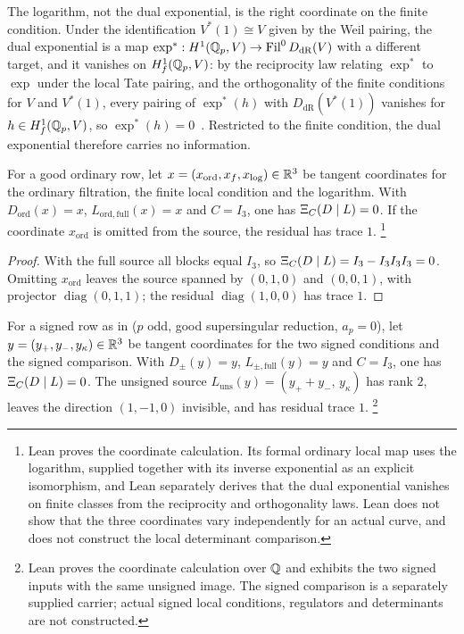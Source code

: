 The logarithm, not the dual exponential, is the right coordinate on the
finite condition.  Under the identification $V^*(1)\cong V$ given by the
Weil pairing, the dual exponential is a map
$\exp^*:H^1(\mathbb{Q}_p,V)\to\operatorname{Fil}^0D_{\mathrm{dR}}(V)$ with a
different target, and it vanishes on $H^1_f(\mathbb{Q}_p,V)$: by the reciprocity law
relating $\exp^*$ to $\exp$ under the local Tate pairing, and the
orthogonality of the finite conditions for $V$ and $V^*(1)$, every
pairing of $\exp^*(h)$ with $D_{\mathrm{dR}}(V^*(1))$ vanishes for
$h\in H^1_f(\mathbb{Q}_p,V)$, so $\exp^*(h)=0$~\citep{BlochKato1990,Kato2004}.
Restricted to the finite condition, the dual exponential therefore
carries no information.

\begin{theorem}\label{thm:apparatus:ordinary-schur-collapse}
For a good ordinary row, let $x=(x_{\mathrm{ord}},x_f,x_{\log})\in\mathbb{R}^3$ be
tangent coordinates for the ordinary filtration, the finite local
condition and the logarithm.  With
$D_{\mathrm{ord}}(x)=x$, $L_{\mathrm{ord,full}}(x)=x$ and $C=I_3$, one has
$\Xi_C(D\mid L)=0$.  If the coordinate $x_{\mathrm{ord}}$ is omitted from the source,
the residual has trace $1$.%
\footnote{Lean proves the coordinate calculation.  Its formal ordinary
local map uses the logarithm, supplied together with its inverse
exponential as an explicit isomorphism, and Lean separately derives that
the dual exponential vanishes on finite classes from the reciprocity and
orthogonality laws.  Lean does not show that the three coordinates vary
independently for an actual curve, and does not construct the local
determinant comparison.}
\end{theorem}

\begin{proof}
With the full source all blocks equal $I_3$, so $\Xi_C(D\mid L)=I_3-I_3I_3I_3=0$.
Omitting $x_{\mathrm{ord}}$ leaves the source spanned by $(0,1,0)$ and
$(0,0,1)$, with projector $\operatorname{diag}(0,1,1)$; the residual
$\operatorname{diag}(1,0,0)$ has trace $1$.
\end{proof}

\begin{theorem}\label{thm:apparatus:signed-schur-collapse}
For a signed row as in  ($p$ odd, good
supersingular reduction, $a_p=0$), let $y=(y_+,y_-,y_{\kappa})\in\mathbb{R}^3$ be
tangent coordinates for the two signed conditions and the signed
comparison.  With $D_{\pm}(y)=y$, $L_{\pm,\mathrm{full}}(y)=y$ and
$C=I_3$, one has $\Xi_C(D\mid L)=0$.  The unsigned source
$L_{\mathrm{uns}}(y)=(y_++y_-,\,y_{\kappa})$ has rank $2$, leaves the
direction $(1,-1,0)$ invisible, and has residual trace $1$.%
\footnote{Lean proves the coordinate calculation over $\mathbb{Q}$ and exhibits the
two signed inputs with the same unsigned image.  The signed comparison is
a separately supplied carrier; actual signed local conditions, regulators
and determinants are not constructed.}
\end{theorem}

